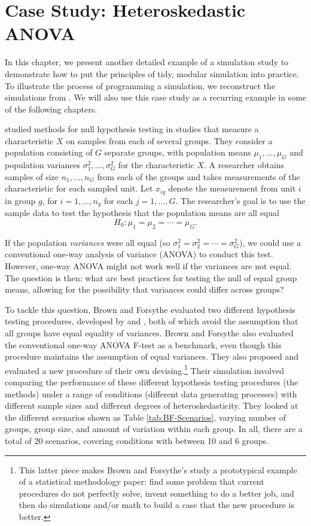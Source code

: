 \documentclass[
]{book}
\begin{document}
\chapter{Case Study: Heteroskedastic ANOVA}\label{case-ANOVA}

In this chapter, we present another detailed example of a simulation study to demonstrate how to put the principles of tidy, modular simulation into practice.
To illustrate the process of programming a simulation, we reconstruct the simulations from \citet{brown1974SmallSampleBehavior}.
We will also use this case study as a recurring example in some of the following chapters.

\citet{brown1974SmallSampleBehavior} studied methods for null hypothesis testing in studies that measure a characteristic \(X\) on samples from each of several groups. They consider a population consisting of \(G\) separate groups, with population means \(\mu_1,...,\mu_G\) and population variances \(\sigma_1^2,...,\sigma_G^2\) for the characteristic \(X\).
A researcher obtains samples of size \(n_1,...,n_G\) from each of the groups and takes measurements of the characteristic for each sampled unit.
Let \(x_{ig}\) denote the measurement from unit \(i\) in group \(g\), for \(i = 1,...,n_g\) for each \(j = 1,..., G\).
The researcher's goal is to use the sample data to test the hypothesis that the population means are all equal
\[
H_0: \mu_1 = \mu_2 = \cdots = \mu_G.
\]

If the population \emph{variances} were all equal (so \(\sigma_1^2 = \sigma_2^2 = \cdots = \sigma_G^2\)), we could use a conventional one-way analysis of variance (ANOVA) to conduct this test.
However, one-way ANOVA might not work well if the variances are not equal.
The question is then: what are best practices for testing the null of equal group means, allowing for the possibility that variances could differ across groups?

To tackle this question, Brown and Forsythe evaluated two different hypothesis testing procedures, developed by \citet{james1951ComparisonSeveralGroups} and \citet{welch1951ComparisonSeveralMean}, both of which avoid the assumption that all groups have equal equality of variances.
Brown and Forsythe also evaluated the conventional one-way ANOVA F-test as a benchmark, even though this procedure maintains the assumption of equal variances.
They also proposed and evaluated a new procedure of their own devising.\footnote{This latter piece makes Brown and Forsythe's study a prototypical example of a statistical methodology paper: find some problem that current procedures do not perfectly solve, invent something to do a better job, and then do simulations and/or math to build a case that the new procedure is better.}
Their simulation involved comparing the performance of these different hypothesis testing procedures (the methods) under a range of conditions (different data generating processes) with different sample sizes and different degrees of heteroskedasticity.
They looked at the different scenarios shown as Table \ref{tab:BF-Scenarios}, varying number of groups, group size, and amount of variation within each group.
In all, there are a total of 20 scenarios, covering conditions with between 10 and 6 groups.
\end{document}
